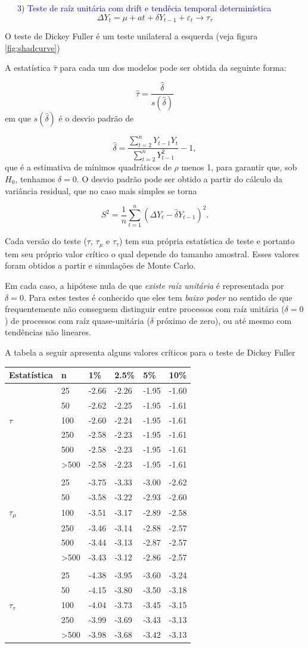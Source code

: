 \documentclass[
]{book}
\theoremstyle{definition}
\theoremstyle{definition}
\theoremstyle{definition}
\theoremstyle{remark}
\begin{document}
~~~3) \textcolor{blue}{ Teste de raíz unitária com drift e tendêcia temporal determinística} \[\Delta  Y_t = \mu+at+\delta Y_{t-1}+\varepsilon_t \rightarrow \tau_{\tau}\]

O teste de Dickey Fuller é um teste unilateral a esquerda (veja figura \ref{fig:shadcurve})

A estatística \(\hat{\tau}\) para cada um dos modelos pode ser obtida da seguinte forma:

\begin{equation}
\hat{\tau}=\frac{\hat{\delta}}{s(\hat{\delta})}
\label{eq:esttau}
\end{equation}
em que \(s(\hat{\delta})\) é o desvio padrão de

\[\hat{\delta}=\frac{\sum_{t=2}^{n} Y_{t-1}Y_t}{\sum_{t=2}^{n}Y_{t-1}^2}-1,\]
que é a estimativa de mínimos quadráticos de \(\rho\) menos 1, para garantir que, sob \(H_0\), tenhamos \(\delta=0\). O desvio padrão pode ser obtido a partir do cálculo da variância residual, que no caso mais simples se torna

\[S^2=\frac{1}{n}\sum_{t=1}^{n}(\Delta Y_t-\hat{\delta}Y_{t-1})^2.\]

Cada versão do teste (\(\tau\), \(\tau_\mu\) e \(\tau_\tau\)) tem sua própria estatística de teste e portanto tem seu próprio valor crítico o qual depende do tamanho amostral. Esses valores foram obtidos a partir e simulações de Monte Carlo.

Em cada caso, a hipótese nula de que \emph{existe raíz unitária} é representada por \(\delta=0\). Para estes testes é conhecido que eles tem \emph{baixo poder} no sentido de que frequentemente não conseguem distinguir entre processos com raíz unitária (\(\delta=0\))
de processos com raíz quase-unitária (\(\delta\) próximo de zero), ou até mesmo com tendências não lineares.

A tabela a seguir apresenta alguns valores críticos para o teste de Dickey Fuller

\begin{longtable}[]{@{}llllll@{}}
\toprule
Estatística & n & 1\% & 2.5\% & 5\% & 10\%\tabularnewline
\midrule
\endhead
& 25 & -2.66 & -2.26 & -1.95 & -1.60\tabularnewline
& 50 & -2.62 & -2.25 & -1.95 & -1.61\tabularnewline
\(\tau\) & 100 & -2.60 & -2.24 & -1.95 & -1.61\tabularnewline
& 250 & -2.58 & -2.23 & -1.95 & -1.61\tabularnewline
& 500 & -2.58 & -2.23 & -1.95 & -1.61\tabularnewline
& \textgreater500 & -2.58 & -2.23 & -1.95 & -1.61\tabularnewline
& & & & &\tabularnewline
& 25 & -3.75 & -3.33 & -3.00 & -2.62\tabularnewline
& 50 & -3.58 & -3.22 & -2.93 & -2.60\tabularnewline
\(\tau_\mu\) & 100 & -3.51 & -3.17 & -2.89 & -2.58\tabularnewline
& 250 & -3.46 & -3.14 & -2.88 & -2.57\tabularnewline
& 500 & -3.44 & -3.13 & -2.87 & -2.57\tabularnewline
& \textgreater500 & -3.43 & -3.12 & -2.86 & -2.57\tabularnewline
& & & & &\tabularnewline
& 25 & -4.38 & -3.95 & -3.60 & -3.24\tabularnewline
& 50 & -4.15 & -3.80 & -3.50 & -3.18\tabularnewline
\(\tau_\tau\) & 100 & -4.04 & -3.73 & -3.45 & -3.15\tabularnewline
& 250 & -3.99 & -3.69 & -3.43 & -3.13\tabularnewline
& \textgreater500 & -3.98 & -3.68 & -3.42 & -3.13\tabularnewline
\bottomrule
\end{longtable}
\end{document}
